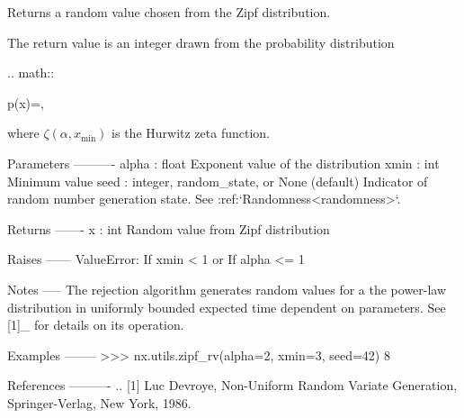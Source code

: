 \begin{DoxyVerb}Returns a random value chosen from the Zipf distribution.

The return value is an integer drawn from the probability distribution

.. math::

    p(x)=,

where $\zeta(\alpha, x_{\min})$ is the Hurwitz zeta function.

Parameters
----------
alpha : float
  Exponent value of the distribution
xmin : int
  Minimum value
seed : integer, random_state, or None (default)
    Indicator of random number generation state.
    See :ref:`Randomness<randomness>`.

Returns
-------
x : int
  Random value from Zipf distribution

Raises
------
ValueError:
  If xmin < 1 or
  If alpha <= 1

Notes
-----
The rejection algorithm generates random values for a the power-law
distribution in uniformly bounded expected time dependent on
parameters.  See [1]_ for details on its operation.

Examples
--------
>>> nx.utils.zipf_rv(alpha=2, xmin=3, seed=42)
8

References
----------
.. [1] Luc Devroye, Non-Uniform Random Variate Generation,
   Springer-Verlag, New York, 1986.
\end{DoxyVerb}
 
